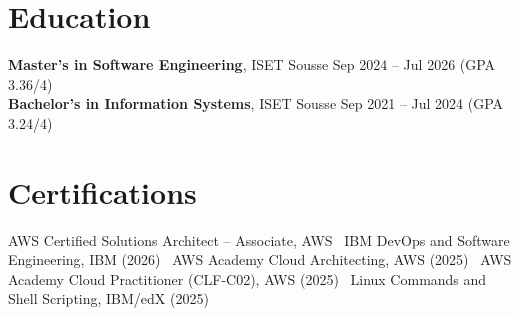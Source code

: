 \documentclass[a4paper,10pt]{article}
\begin{document}
\section*{Education}
\textbf{Master's in Software Engineering}, ISET Sousse \hfill Sep 2024 -- Jul 2026 (GPA 3.36/4)\\
\textbf{Bachelor's in Information Systems}, ISET Sousse \hfill Sep 2021 -- Jul 2024 (GPA 3.24/4)

\section*{Certifications}
AWS Certified Solutions Architect -- Associate, AWS \textbar\ IBM DevOps and Software Engineering, IBM (2026) \textbar\ AWS Academy Cloud Architecting, AWS (2025) \textbar\ AWS Academy Cloud Practitioner (CLF-C02), AWS (2025) \textbar\ Linux Commands and Shell Scripting, IBM/edX (2025)
\end{document}
